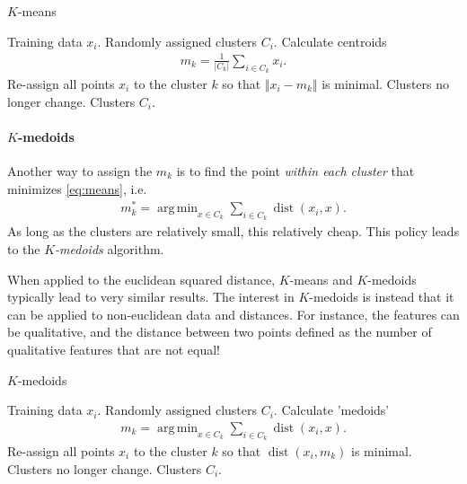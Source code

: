 \documentclass{article}
\DeclareMathOperator*{\argmin}{arg\,min}
\newcommand{\abs}[1]{\vert #1 \vert}
\newcommand{\norm}[1]{\Vert #1 \Vert}
\DeclareMathOperator{\dist}{dist}
\begin{document}
\begin{algorithm}[tb]      
	\caption{$K$-means} 
	\label{alg:kmeans}
	\begin{algorithmic} [1]
 		\REQUIRE Training data $x_i$.
 		\STATE Randomly assigned clusters $C_i$.
 		\REPEAT
 			\STATE Calculate centroids
            \begin{align*}
                m_k = \frac{1}{\abs{C_k}}\sum_{i \in C_k}x_i.
            \end{align*}
            \STATE Re-assign all points $x_i$ to the cluster $k$ so that $\norm{x_i-m_k}$ is minimal.
 		\UNTIL Clusters no longer change.
 		\RETURN Clusters $C_i$.
	\end{algorithmic}
\end{algorithm}

\paragraph{$K$-medoids} Another way to assign the $m_k$ is to find the point \emph{within each cluster} that minimizes \eqref{eq:means}, i.e.
\begin{align*}
    m_k^* = \argmin_{x \in C_k} \sum_{i\in C_k} \dist(x_i,x).
\end{align*}
As long as the clusters are relatively small, this relatively cheap. This policy leads to the \emph{$K$-medoids} algorithm. 

When applied to the euclidean squared distance, $K$-means and $K$-medoids typically lead to very similar results. The interest in $K$-medoids is instead that it can be applied to non-euclidean data and distances. For instance, the features can be qualitative, and the distance between two points defined as the number of qualitative features that are not equal!


\begin{algorithm}[tb]      
	\caption{$K$-medoids} 
	\label{alg:kmedoids}
	\begin{algorithmic} [1]
 		\REQUIRE Training data $x_i$.
 		\STATE Randomly assigned clusters $C_i$.
 		\REPEAT
 			\STATE Calculate 'medoids'
            \begin{align*}
                m_k = \argmin_{x \in C_k} \sum_{i\in C_k} \dist(x_i,x).
            \end{align*}
            \STATE Re-assign all points $x_i$ to the cluster $k$ so that $\dist(x_i,m_k)$ is minimal.
 		\UNTIL Clusters no longer change.
 		\RETURN Clusters $C_i$.
	\end{algorithmic}
\end{algorithm}
\end{document}

